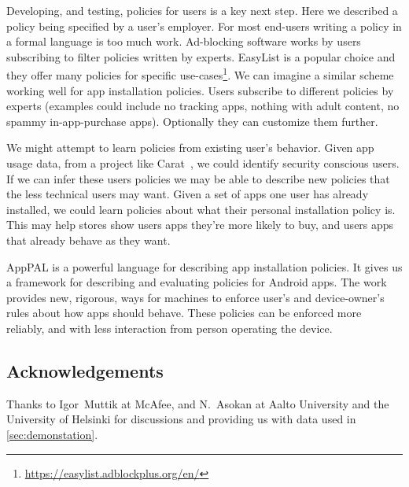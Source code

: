\documentclass[]{llncs}
\begin{document}
Developing, and testing, policies for users is a key next step.
Here we described a policy being specified by a user's employer.
For most end-users writing a policy in a formal language is too much work.
Ad-blocking software works by users subscribing to filter policies written by experts.
EasyList is a popular choice and they offer many policies for specific use-cases\footnote{\url{https://easylist.adblockplus.org/en/}}.
We can imagine a similar scheme working well for app installation policies.
Users subscribe to different policies by experts (examples could include no tracking apps, nothing with adult content, no spammy in-app-purchase apps).
Optionally they can customize them further.

We might attempt to learn policies from existing user's behavior.
Given app usage data, from a project like Carat~\cite{Oliner:2013ht}, we could identify security conscious users.
If we can infer these users policies we may be able to describe new policies that the less technical users may want.
Given a set of apps one user has already installed, we could learn policies about what their personal installation policy is.
This may help stores show users apps they're more likely to buy, and users apps that already behave as they want.

AppPAL is a powerful language for describing app installation policies.
It gives us a framework for describing and evaluating policies for Android apps.
The work provides new, rigorous, ways for machines to enforce user's and device-owner's rules about how apps should behave.
These policies can be enforced more reliably, and with less interaction from person operating the device.

\subsection*{Acknowledgements}

Thanks to Igor~Muttik at McAfee, and N.~Asokan at Aalto University and the University of Helsinki for discussions and providing us with data used in \autoref{sec:demonstation}.



\end{document}
